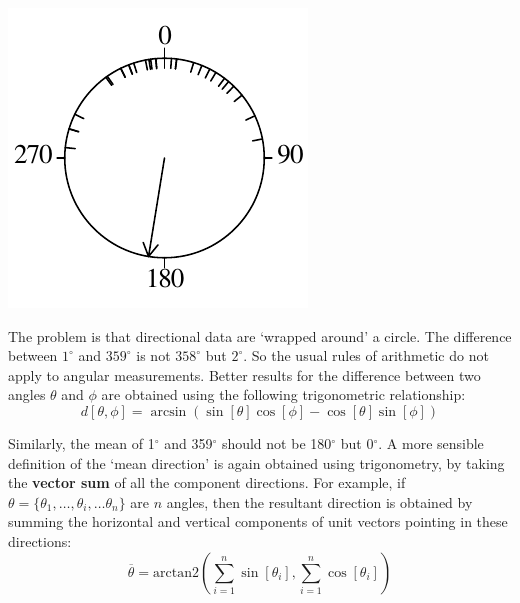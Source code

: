 \noindent\begin{minipage}[t][][b]{.25\textwidth}
\includegraphics[width=\textwidth]{../figures/circle2.pdf}\medskip
\end{minipage}
\begin{minipage}[t][][t]{.75\textwidth}
  \label{fig:circle2}
\end{minipage}

The problem is that directional data are `wrapped around' a circle.
The difference between $1^{\circ}$ and $359^{\circ}$ is not
$358^{\circ}$ but $2^{\circ}$. So the usual rules of arithmetic do not
apply to angular measurements. Better results for the difference
between two angles $\theta$ and $\phi$ are obtained using the
following trigonometric relationship:
\begin{equation}
  d[\theta,\phi] =
  \arcsin\left( \sin[\theta] \cos[\phi] -
  \cos[\theta] \sin[\phi] \right)
  \label{eq:anglediff}
\end{equation}

Similarly, the mean of 1$^\circ$ and 359$^\circ$ should not be
180$^\circ$ but 0$^\circ$. A more sensible definition of the `mean
direction' is again obtained using trigonometry, by taking the
\textbf{vector sum} of all the component directions. For example, if
$\theta = \{\theta_1, \ldots, \theta_i, \ldots \theta_n \}$ are $n$
angles, then the resultant direction is obtained by summing the
horizontal and vertical components of unit vectors pointing in these
directions:
\begin{equation}
  \overline{\theta} = \mbox{arctan2}\left(
  \sum_{i=1}^{n}\sin[\theta_i],\sum_{i=1}^{n}\cos[\theta_i]
  \right)
  \label{eq:averagedirection}
\end{equation}

